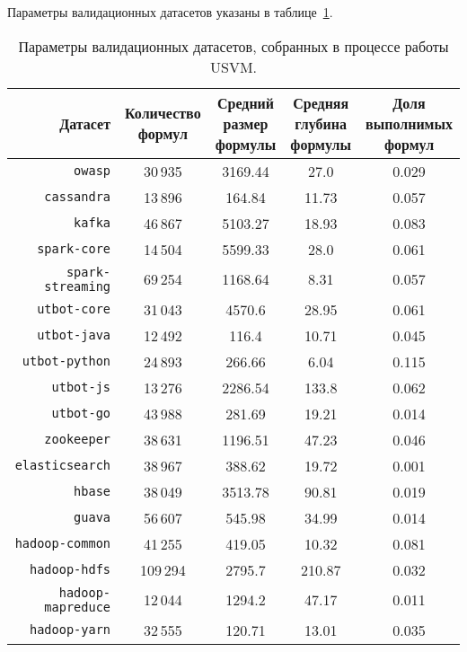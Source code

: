 Параметры валидационных датасетов указаны в таблице~\ref{usvm-val-datasets-table}.

\begin{table}[ht]
\begin{center}
\begin{tabular}{r|cccc}
    Датасет & \makecell{Количество \\ формул} & \makecell{Средний \\ размер \\ формулы} & \makecell{Средняя \\ глубина \\ формулы} & \makecell{Доля \\ выполнимых \\ формул} \\
    \hline \hline
    \rule{0pt}{2.5ex}
    \texttt{owasp} & 30\,935 & 3169.44 & 27.0 & 0.029 \\
    \texttt{cassandra} & 13\,896 & 164.84 & 11.73 & 0.057 \\
    \texttt{kafka} & 46\,867 & 5103.27 & 18.93 & 0.083 \\
    \texttt{spark-core} & 14\,504 & 5599.33 & 28.0 & 0.061 \\
    \texttt{spark-streaming} & 69\,254 & 1168.64 & 8.31 & 0.057 \\
    \texttt{utbot-core} & 31\,043 & 4570.6 & 28.95 & 0.061 \\
    \texttt{utbot-java} & 12\,492 & 116.4 & 10.71 & 0.045 \\
    \texttt{utbot-python} & 24\,893 & 266.66 & 6.04 & 0.115 \\
    \texttt{utbot-js} & 13\,276 & 2286.54 & 133.8 & 0.062 \\
    \texttt{utbot-go} & 43\,988 & 281.69 & 19.21 & 0.014 \\
    \texttt{zookeeper} & 38\,631 & 1196.51 & 47.23 & 0.046 \\
    \texttt{elasticsearch} & 38\,967 & 388.62 & 19.72 & 0.001 \\
    \texttt{hbase} & 38\,049 & 3513.78 & 90.81 & 0.019 \\
    \texttt{guava} & 56\,607 & 545.98 & 34.99 & 0.014 \\
    \texttt{hadoop-common} & 41\,255 & 419.05 & 10.32 & 0.081 \\
    \texttt{hadoop-hdfs} & 109\,294 & 2795.7 & 210.87 & 0.032 \\
    \texttt{hadoop-mapreduce} & 12\,044 & 1294.2 & 47.17 & 0.011 \\
    \texttt{hadoop-yarn} & 32\,555 & 120.71 & 13.01 & 0.035 \\
\end{tabular}
\caption{\label{usvm-val-datasets-table} Параметры валидационных датасетов, собранных в процессе работы USVM.}
\end{center}
\end{table}

